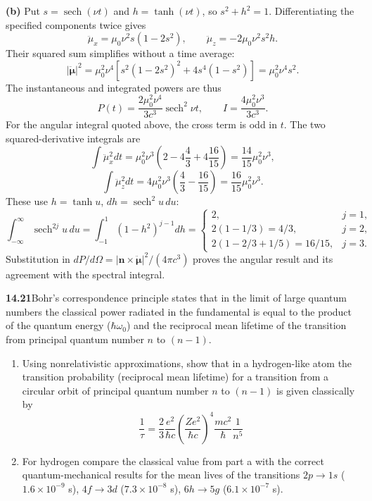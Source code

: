 \textbf{(b)} Put $s=\operatorname{sech}(\nu t)$ and
$h=\tanh(\nu t)$, so $s^2+h^2=1$.
Differentiating the specified components twice gives
\[
\ddot\mu_x=\mu_0\nu^2s(1-2s^2),\qquad
\ddot\mu_z=-2\mu_0\nu^2s^2h.
\]
Their squared sum simplifies without a time average:
\[
|\ddot{\boldsymbol\mu}|^2
=\mu_0^2\nu^4[s^2(1-2s^2)^2+4s^4(1-s^2)]
=\mu_0^2\nu^4s^2.
\]
The instantaneous and integrated powers are thus
\[
\boxed{P(t)=\frac{2\mu_0^2\nu^4}{3c^3}\operatorname{sech}^2\nu t,
\qquad I=\frac{4\mu_0^2\nu^3}{3c^3}.}
\]
For the angular integral quoted above, the cross term is odd in $t$.
The two squared-derivative integrals are
\[
\int\ddot\mu_x^2dt=\mu_0^2\nu^3
\left(2-4\frac43+4\frac{16}{15}\right)
=\frac{14}{15}\mu_0^2\nu^3,
\]
\[
\int\ddot\mu_z^2dt=4\mu_0^2\nu^3
\left(\frac43-\frac{16}{15}\right)
=\frac{16}{15}\mu_0^2\nu^3.
\]
These use $h=\tanh u$, $dh=\operatorname{sech}^2u\,du$:
\[
\int_{-\infty}^{\infty}\operatorname{sech}^{2j}u\,du
=\int_{-1}^{1}(1-h^2)^{j-1}dh
=\begin{cases}
2,&j=1,\\
2(1-1/3)=4/3,&j=2,\\
2(1-2/3+1/5)=16/15,&j=3.
\end{cases}
\]
Substitution in
$dP/d\Omega=|\mathbf n\times\ddot{\boldsymbol\mu}|^2/(4\pi c^3)$
proves the angular result and its agreement with the spectral integral.

\par\bigskip
\noindent\textbf{14.21}\quad Bohr's correspondence principle states that in the limit of large quantum numbers the classical power radiated in the fundamental is equal to the product of the quantum energy ($\hbar\omega_{0}$) and the reciprocal mean lifetime of the transition from principal quantum number $n$ to $(n-1)$.
\begin{enumerate}
\item[(a)] Using nonrelativistic approximations, show that in a hydrogen-like atom the transition probability (reciprocal mean lifetime) for a transition from a circular orbit of principal quantum number $n$ to $(n-1)$ is given classically by
\[
\frac{1}{\tau}=\frac{2}{3}\frac{e^{2}}{\hbar c}\left(\frac{Ze^{2}}{\hbar c}\right)^{4}\frac{mc^{2}}{\hbar}\frac{1}{n^{5}}
\]
\item[(b)] For hydrogen compare the classical value from part a with the correct quantum-mechanical results for the mean lives of the transitions $2p\to1s$ ($1.6\times10^{-9}$ s), $4f\to3d$ ($7.3\times10^{-8}$ s), $6h\to5g$ ($6.1\times10^{-7}$ s).
\end{enumerate}
\solution

